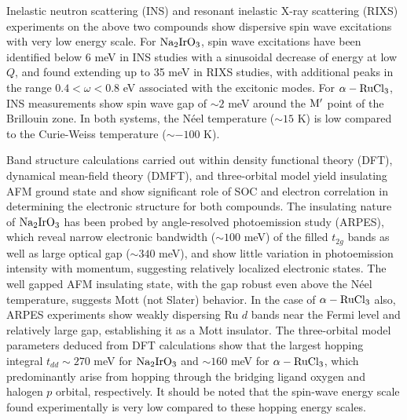\documentclass[aps,prb,fleqn,12pt,amsmath,amssymb]{revtex4}
\begin{document}
 
Inelastic neutron scattering (INS) and resonant inelastic X-ray scattering (RIXS) experiments on the above two compounds show dispersive spin wave excitations with very low energy scale. For $\rm Na_2IrO_3$, spin wave excitations have been identified below 6 meV in INS studies with a sinusoidal decrease of energy at low $Q$,\cite{choi_PRL_2012} and found extending up to 35 meV in RIXS studies, with additional peaks in the range $0.4 < \omega < 0.8$ eV associated with the excitonic modes.\cite{gretarsson_PRB_2013} For $\alpha-{\rm RuCl_3}$, INS measurements show spin wave gap of 
$\sim 2$ meV around the ${\rm M'}$ point of the Brillouin zone.\cite{ran_PRL_2017} In both systems, the N\'{e}el temperature ($\sim 15$ K) is low compared to the Curie-Weiss temperature ($\sim -100$ K).\cite{choi_PRL_2012,sears_PRB_2015}


Band structure calculations carried out within density functional theory (DFT), dynamical mean-field theory (DMFT), and three-orbital model yield insulating AFM ground state and show significant role of SOC and electron correlation in determining the electronic structure for both compounds.\cite{foyevtsova_PRB_2013,yamaji_PRL_2014,kim_PRB_2015,kim_PRB_2016,laubach_PRB_2017} The insulating nature of $\rm Na_2IrO_3$ has been probed by angle-resolved photoemission study (ARPES),\cite{comin_PRL_2012} which reveal narrow electronic bandwidth ($\sim 100$ meV) of the filled $t_{2g}$ bands as well as large optical gap ($\sim 340$ meV), and show little variation in photoemission intensity with momentum, suggesting relatively localized electronic states. The well gapped AFM insulating state, with the gap robust even above the N\'{e}el temperature, suggests Mott (not Slater) behavior.\cite{kim_PRB_2016} In the case of $\alpha-\rm{RuCl_3}$ also, ARPES experiments show weakly dispersing Ru $d$ bands near the Fermi level and relatively large gap,\cite{zhou_PRB_2016,koitzsch_PRL_2016,sandilands_PRB_2016} establishing it as a Mott insulator. The three-orbital model parameters deduced from DFT calculations show that the largest hopping integral $t_{dd} \sim 270$ meV for ${\rm Na_2IrO_3}$ and $\sim 160$ meV for $\alpha-\rm{RuCl_3}$, which predominantly arise from hopping through the bridging ligand oxygen and halogen $p$ orbital, respectively.\cite{foyevtsova_PRB_2013,winter_PRB_2016} It should be noted that the spin-wave energy scale found experimentally is very low compared to these hopping energy scales.
\end{document}
